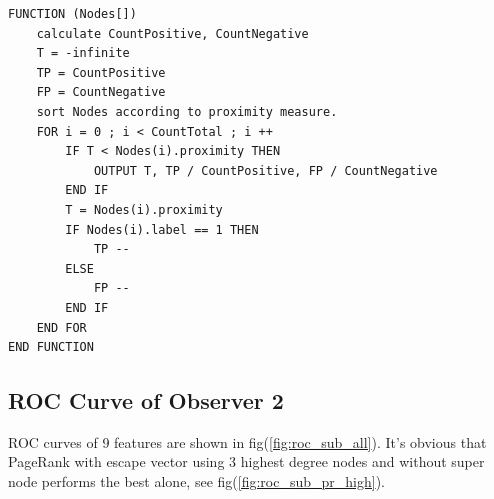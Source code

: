 \documentclass[11pt,a4paper]{article}
\begin{document}
\begin{Verbatim}
FUNCTION (Nodes[])
	calculate CountPositive, CountNegative
	T = -infinite
	TP = CountPositive
	FP = CountNegative
	sort Nodes according to proximity measure. 
	FOR i = 0 ; i < CountTotal ; i ++ 
		IF T < Nodes(i).proximity THEN
			OUTPUT T, TP / CountPositive, FP / CountNegative
		END IF
		T = Nodes(i).proximity
		IF Nodes(i).label == 1 THEN
			TP -- 
		ELSE
			FP --
		END IF
	END FOR
END FUNCTION
\end{Verbatim}

\subsection*{ROC Curve of Observer 2}

ROC curves of 9 features are shown in fig(\ref{fig:roc_sub_all}).
It's obvious that PageRank with escape vector using 3 highest 
degree nodes and without super node performs the best alone, 
see fig(\ref{fig:roc_sub_pr_high}). 
\end{document}
